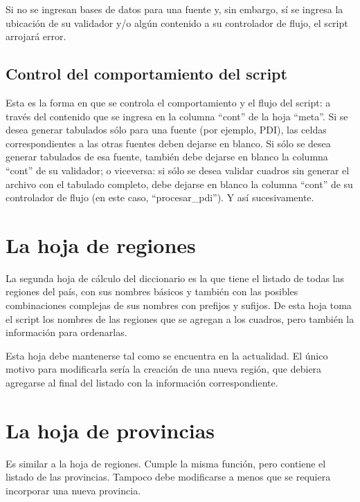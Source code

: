 \documentclass[
  spanish,
]{book}
\begin{document}
Si no se ingresan bases de datos para una fuente y, sin embargo, sí se ingresa la ubicación de su validador y/o algún contenido a su controlador de flujo, el script arrojará error.

\hypertarget{control-del-comportamiento-del-script}{%
\subsection{Control del comportamiento del script}\label{control-del-comportamiento-del-script}}

Esta es la forma en que se controla el comportamiento y el flujo del script: a través del contenido que se ingresa en la columna ``cont'' de la hoja ``meta''. Si se desea generar tabulados sólo para una fuente (por ejemplo, PDI), las celdas correspondientes a las otras fuentes deben dejarse en blanco. Si sólo se desea generar tabulados de esa fuente, también debe dejarse en blanco la columna ``cont'' de su validador; o viceversa: si sólo se desea validar cuadros sin generar el archivo con el tabulado completo, debe dejarse en blanco la columna ``cont'' de su controlador de flujo (en este caso, ``procesar\_pdi''). Y así sucesivamente.

\hypertarget{la-hoja-de-regiones}{%
\section{La hoja de regiones}\label{la-hoja-de-regiones}}

La segunda hoja de cálculo del diccionario es la que tiene el listado de todas las regiones del país, con sus nombres básicos y también con las posibles combinaciones complejas de sus nombres con prefijos y sufijos. De esta hoja toma el script los nombres de las regiones que se agregan a los cuadros, pero también la información para ordenarlas.

Esta hoja debe mantenerse tal como se encuentra en la actualidad. El único motivo para modificarla sería la creación de una nueva región, que debiera agregarse al final del listado con la información correspondiente.

\hypertarget{la-hoja-de-provincias}{%
\section{La hoja de provincias}\label{la-hoja-de-provincias}}

Es similar a la hoja de regiones. Cumple la misma función, pero contiene el listado de las provincias. Tampoco debe modificarse a menos que se requiera incorporar una nueva provincia.
\end{document}
